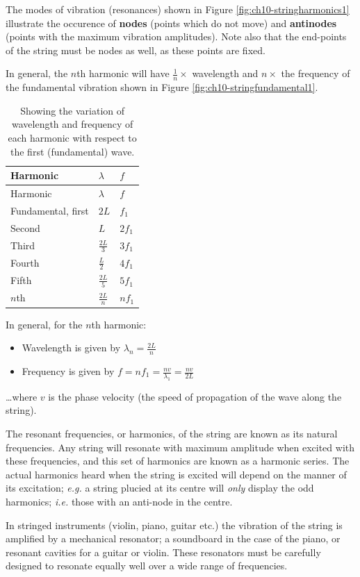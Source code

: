 \documentclass[
]{book}
\providecommand{\tightlist}{%
  \setlength{\itemsep}{0pt}\setlength{\parskip}{0pt}}
\begin{document}
The modes of vibration (resonances) shown in Figure \ref{fig:ch10-stringharmonics1} illustrate the occurence of \textbf{nodes} (points which do not move) and \textbf{antinodes} (points with the maximum vibration amplitudes). Note also that the end-points of the string must be nodes as well, as these points are fixed.

In general, the \(n\)th harmonic will have \(\frac{1}{n} \times\) wavelength and \(n \times\) the frequency of the fundamental vibration shown in Figure \ref{fig:ch10-stringfundamental1}.

\begin{longtable}[]{@{}lll@{}}
\caption{\label{tab:ch10-standingfrequencies} Showing the variation of wavelength and frequency of each harmonic with respect to the first (fundamental) wave.}\tabularnewline
\toprule
Harmonic & \(\lambda\) & \(f\)\tabularnewline
\midrule
\endfirsthead
\toprule
Harmonic & \(\lambda\) & \(f\)\tabularnewline
\midrule
\endhead
Fundamental, first & \(2L\) & \(f_1\)\tabularnewline
Second & \(L\) & \(2f_1\)\tabularnewline
Third & \(\frac{2L}{3}\) & \(3f_1\)\tabularnewline
Fourth & \(\frac{L}{2}\) & \(4f_1\)\tabularnewline
Fifth & \(\frac{2L}{5}\) & \(5f_1\)\tabularnewline
\(n\)th & \(\frac{2L}{n}\) & \(nf_1\)\tabularnewline
\bottomrule
\end{longtable}

In general, for the \(n\)th harmonic:

\begin{itemize}
\tightlist
\item
  Wavelength is given by \(\lambda_n = \frac{2L}{n}\)
\item
  Frequency is given by \(f = nf_1 = \frac{nv}{\lambda_1} = \frac{nv}{2L}\)
\end{itemize}

\ldots where \(v\) is the phase velocity (the speed of propagation of the wave along the string).

The resonant frequencies, or harmonics, of the string are known as its natural frequencies. Any string will resonate with maximum amplitude when excited with these frequencies, and this set of harmonics are known as a harmonic series. The actual harmonics heard when the string is excited will depend on the manner of its excitation; \emph{e.g.} a string plucied at its centre will \emph{only} display the odd harmonics; \emph{i.e.} those with an anti-node in the centre.

In stringed instruments (violin, piano, guitar etc.) the vibration of the string is amplified by a mechanical resonator; a soundboard in the case of the piano, or resonant cavities for a guitar or violin. These resonators must be carefully designed to resonate equally well over a wide range of frequencies.
\end{document}

